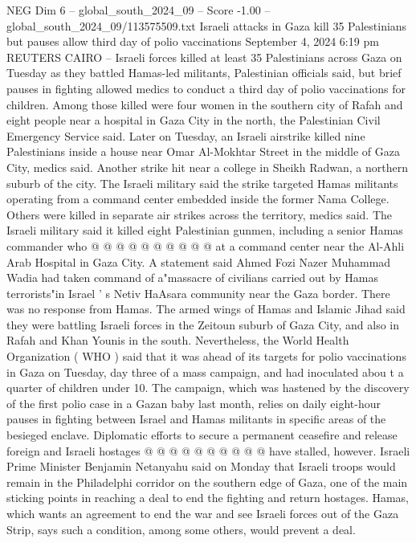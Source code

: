 \begin{textsample}{NEG Dim 6 – global\_south\_2024\_09 – Score -1.00 – global\_south\_2024\_09/113575509.txt}  \label{ex:f6_neg_034}
Israeli attacks in Gaza kill 35 Palestinians but pauses allow third day of polio vaccinations September 4, 2024 6:19 pm REUTERS CAIRO -- Israeli forces killed at least 35 Palestinians across Gaza on Tuesday as they battled Hamas-led militants, Palestinian officials said, but brief pauses in fighting allowed medics to conduct a third day of polio vaccinations for children.
Among those killed were four women in the southern city of Rafah and eight people near a hospital in Gaza City in the north, the Palestinian Civil Emergency Service said.
Later on Tuesday, an Israeli airstrike killed nine Palestinians inside a house near Omar Al-Mokhtar Street in the middle of Gaza City, medics said.
Another strike hit near a college in Sheikh Radwan, a northern suburb of the city.
The Israeli military said the strike targeted Hamas militants operating from a command center embedded inside the former Nama College.
Others were killed in separate air strikes across the territory, medics said.
The Israeli military said it killed eight Palestinian gunmen, including a senior Hamas commander who @ @ @ @ @ @ @ @ @ @ at a command center near the Al-Ahli Arab Hospital in Gaza City.
A statement said Ahmed Fozi Nazer Muhammad Wadia had taken command of a"massacre of civilians carried out by Hamas terrorists"in Israel ' s Netiv HaAsara community near the Gaza border.
There was no response from Hamas.
The armed wings of Hamas and Islamic Jihad said they were battling Israeli forces in the Zeitoun suburb of Gaza City, and also in Rafah and Khan Younis in the south.
Nevertheless, the World Health Organization ( WHO ) said that it was ahead of its targets for polio vaccinations in Gaza on Tuesday, day three of a mass campaign, and had inoculated abou t a quarter of children under 10.
The campaign, which was hastened by the discovery of the first polio case in a Gazan baby last month, relies on daily eight-hour pauses in fighting between Israel and Hamas militants in specific areas of the besieged enclave.
Diplomatic efforts to secure a permanent ceasefire and release foreign and Israeli hostages @ @ @ @ @ @ @ @ @ @ have stalled, however.
Israeli Prime Minister Benjamin Netanyahu said on Monday that Israeli troops would remain in the Philadelphi corridor on the southern edge of Gaza, one of the main sticking points in reaching a deal to end the fighting and return hostages.
Hamas, which wants an agreement to end the war and see Israeli forces out of the Gaza Strip, says such a condition, among some others, would prevent a deal.

\end{textsample}
